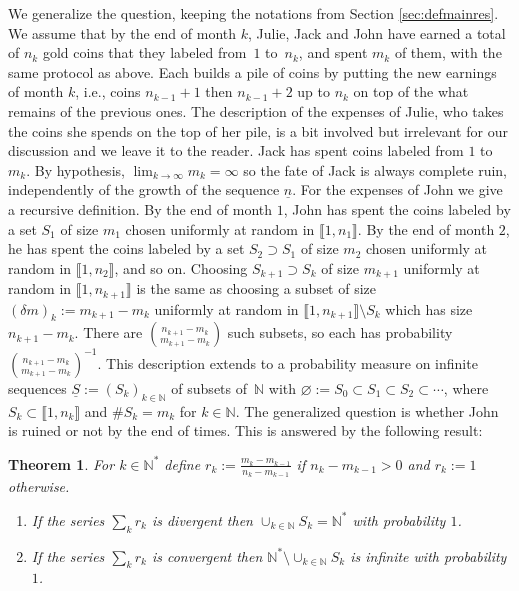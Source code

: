 \documentclass[pdftex]{sigma}%
\newcommand{\kN}{k\in \mathbb{N}}
\newcommand{\intt}[1]{\llbracket #1 \rrbracket}
\newtheorem{Theorem}{Theorem}[section]
\begin{document}
We generalize the question, keeping the notations from Section \ref{sec:defmainres}. We assume that by the end of month $k$, Julie, Jack and John have earned a total of $n_k$ gold coins that they labeled from~$1$ to~$n_k$, and spent $m_k$ of them, with the same protocol as above. Each builds a pile of coins by putting the new earnings of month $k$, i.e., coins $n_{k-1}+1$ then $n_{k-1}+2$ up to $n_k$ on top of the what remains of the previous ones. The description of the expenses of Julie, who takes the coins she spends on the top of her pile, is a bit involved but irrelevant for our discussion and we leave it to the reader. Jack has spent coins labeled from $1$ to $m_k$. By hypothesis, $\lim_{k\to \infty} m_k=\infty$ so the fate of Jack is always complete ruin, independently of the growth of the sequence $\underline{n}$. For the expenses of John we give a recursive definition. By the end of month $1$, John has spent the coins labeled by a set $S_1$ of size $m_1$ chosen uniformly at random in $\intt{1,n_1}$. By the end of month $2$, he has spent the coins labeled by a set $S_2 \supset S_1$ of size $m_2$ chosen uniformly at random in $\intt{1,n_2}$, and so on. Choosing $S_{k+1} \supset S_k$ of size $m_{k+1}$ uniformly at random in $\intt{1,n_{k+1}}$ is the same as choosing a subset of size $(\delta m)_k:=m_{k+1}-m_k$ uniformly at random in $\intt{1,n_{k+1}}\setminus S_k$ which has size $n_{k+1}-m_k$. There are $\binom{n_{k+1}-m_k}{m_{k+1}-m_k}$ such subsets, so each has probability $\binom{n_{k+1}-m_k}{m_{k+1}-m_k}^{-1}$. This description extends to a probability measure on infinite sequences $\underline{S}:=(S_k)_{\kN}$ of subsets of~$\mathbb{N}$ with $\varnothing:=S_0\subset S_1 \subset S_2 \subset\cdots$, where $S_k\subset \intt{1,n_k}$ and $\# S_k =m_k$ for $\kN$. The generalized question is whether John is ruined or not by the end of times. This is answered by the following result:

\begin{Theorem} \label{theo:mainfill}
For $\kN^*$ define $r_k:=\frac{m_k-m_{k-1}}{n_{k}-m_{k-1}}$ if $n_{k}-m_{k-1}>0$ and $r_k:=1$ otherwise.
\begin{enumerate}\itemsep=0pt

\item[] If the series $\sum_k r_k$ is divergent then $\cup_{\kN} S_k=\mathbb{N}^*$ with probability $1$.

\item[] If the series $\sum_k r_k$ is convergent then $\mathbb{N}^* \setminus \cup_{\kN} S_k$ is infinite with probability $1$.
 \end{enumerate}
\end{Theorem}
\end{document}
